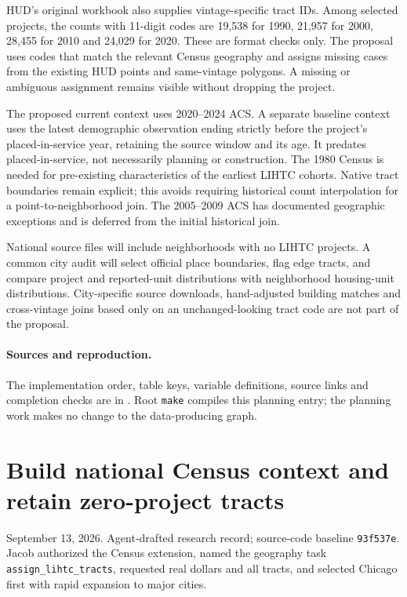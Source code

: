 \documentclass[11pt]{article}
\begin{document}
HUD's original workbook also supplies vintage-specific tract IDs. Among selected
projects, the counts with 11-digit codes are 19,538 for 1990, 21,957 for 2000,
28,455 for 2010 and 24,029 for 2020. These are format checks only. The proposal
uses codes that match the relevant Census geography and assigns missing cases
from the existing HUD points and same-vintage polygons. A missing or ambiguous
assignment remains visible without dropping the project.

The proposed current context uses 2020--2024 ACS. A separate baseline context
uses the latest demographic observation ending strictly before the project's
placed-in-service year, retaining the source window and its age. It predates
placed-in-service, not necessarily planning or construction. The 1980 Census is
needed for pre-existing characteristics of the earliest LIHTC cohorts. Native
tract boundaries remain explicit; this avoids requiring historical count
interpolation for a point-to-neighborhood join. The 2005--2009 ACS has documented
geographic exceptions and is deferred from the initial historical join.

National source files will include neighborhoods with no LIHTC projects. A
common city audit will select official place boundaries, flag edge tracts, and
compare project and reported-unit distributions with neighborhood housing-unit
distributions. City-specific source downloads, hand-adjusted building matches
and cross-vintage joins based only on an unchanged-looking tract code are not
part of the proposal.

\paragraph{Sources and reproduction.} The implementation order, table keys,
variable definitions, source links and completion checks are in
. Root \texttt{make} compiles this planning entry; the
planning work makes no change to the data-producing graph.

\clearpage
\section*{Build national Census context and retain zero-project tracts}
\noindent September 13, 2026. Agent-drafted research record; source-code baseline
\texttt{93f537e}. Jacob authorized the Census extension, named the geography task
\texttt{assign\_lihtc\_tracts}, requested real dollars and all tracts, and selected
Chicago first with rapid expansion to major cities.
\end{document}
